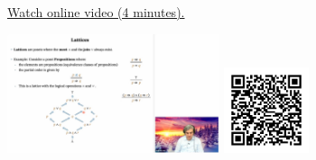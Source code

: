 
\begin{minipage}{10cm}
    \href{https://act4e-spring21.netlify.app/spring2021-tradeoffs:tradeoffs:orders:lattices.html}{Watch online video (4 minutes).}
        
    \href{https://act4e-spring21.netlify.app/spring2021-tradeoffs:tradeoffs:orders:lattices.html}{\includegraphics[height=3.5cm]{spring2021-tradeoffs:tradeoffs:orders:lattices/thumbnails.jpg}}
    \href{https://act4e-spring21.netlify.app/spring2021-tradeoffs:tradeoffs:orders:lattices.html}{\includegraphics[height=2.5cm]{spring2021-tradeoffs:tradeoffs:orders:lattices/qrcode.png}}
\end{minipage}
